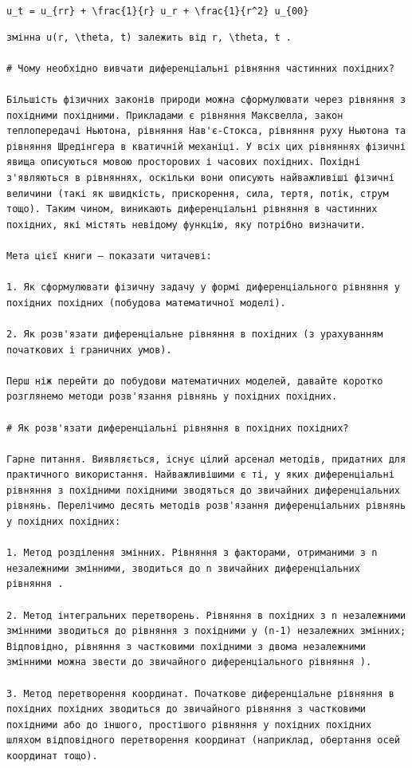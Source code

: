 \documentclass[
  ukrainian,
]{article}
\begin{document}
\texttt{u\_t\ =\ u\_\{rr\}\ +\ \textbackslash{}frac\{1\}\{r\}\ u\_r\ +\ \textbackslash{}frac\{1\}\{r\^{}2\}\ u\_\{00\}}

\begin{verbatim}
змінна u(r, \theta, t) залежить від r, \theta, t .

# Чому необхідно вивчати диференціальні рівняння частинних похідних?

Більшість фізичних законів природи можна сформулювати через рівняння з похідними похідними. Прикладами є рівняння Максвелла, закон теплопередачі Ньютона, рівняння Нав'є-Стокса, рівняння руху Ньютона та рівняння Шредінгера в кватичній механіці. У всіх цих рівняннях фізичні явища описуються мовою просторових і часових похідних. Похідні з'являються в рівняннях, оскільки вони описують найважливіші фізичні величини (такі як швидкість, прискорення, сила, тертя, потік, струм тощо). Таким чином, виникають диференціальні рівняння в частинних похідних, які містять невідому функцію, яку потрібно визначити.

Мета цієї книги — показати читачеві:

1. Як сформулювати фізичну задачу у формі диференціального рівняння у похідних похідних (побудова математичної моделі).

2. Як розв'язати диференціальне рівняння в похідних (з урахуванням початкових і граничних умов).

Перш ніж перейти до побудови математичних моделей, давайте коротко розглянемо методи розв'язання рівнянь у похідних похідних.

# Як розв'язати диференціальні рівняння в похідних похідних?

Гарне питання. Виявляється, існує цілий арсенал методів, придатних для практичного використання. Найважливішими є ті, у яких диференціальні рівняння з похідними похідними зводяться до звичайних диференціальних рівнянь. Перелічимо десять методів розв'язання диференціальних рівнянь у похідних похідних:

1. Метод розділення змінних. Рівняння з факторами, отриманими з n незалежними змінними, зводиться до n звичайних диференціальних  рівняння .

2. Метод інтегральних перетворень. Рівняння в похідних з n незалежними змінними зводиться до рівняння з похідними у (n-1) незалежних змінних; Відповідно, рівняння з частковими похідними з двома незалежними змінними можна звести до звичайного диференціального рівняння ).

3. Метод перетворення координат. Початкове диференціальне рівняння в похідних похідних зводиться до звичайного рівняння з частковими похідними або до іншого, простішого рівняння у похідних похідних шляхом відповідного перетворення координат (наприклад, обертання осей координат тощо).


\end{verbatim}
\end{document}
